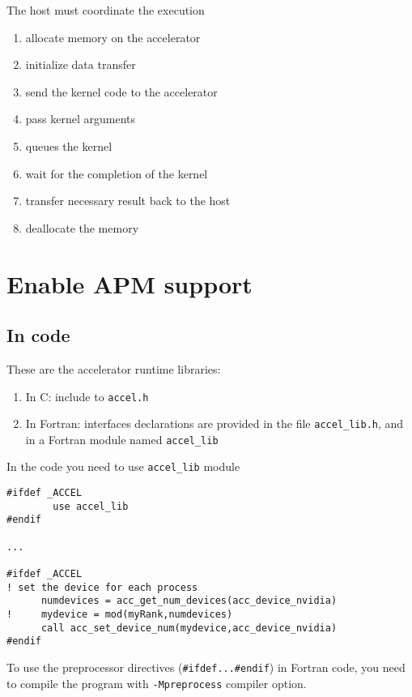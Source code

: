 The host must coordinate the execution
\begin{enumerate}
\item allocate memory on the accelerator
\item initialize data transfer
\item send the kernel code to the accelerator
\item pass kernel arguments
\item queues the kernel
\item wait for the completion of the kernel
\item transfer necessary result back to the host
\item deallocate the memory
\end{enumerate}

\section{Enable APM support}
\label{sec:enable-accelerator}

\subsection{In code}
\label{sec:code}

These are the accelerator runtime libraries:
\begin{enumerate}
\item In C: include to \verb!accel.h!
\item In Fortran: interfaces declarations are provided in the file
  \verb!accel_lib.h!, and in a Fortran module named \verb!accel_lib!
\end{enumerate}
In the code you need to use \verb!accel_lib! module
\begin{lstlisting}
#ifdef _ACCEL
        use accel_lib
#endif 

...

#ifdef _ACCEL
! set the device for each process
      numdevices = acc_get_num_devices(acc_device_nvidia)
!     mydevice = mod(myRank,numdevices)
      call acc_set_device_num(mydevice,acc_device_nvidia)
#endif 
\end{lstlisting}
To use the preprocessor directives (\verb!#ifdef...#endif!) in Fortran
code, you need to compile the program with \verb!-Mpreprocess!
compiler option.

